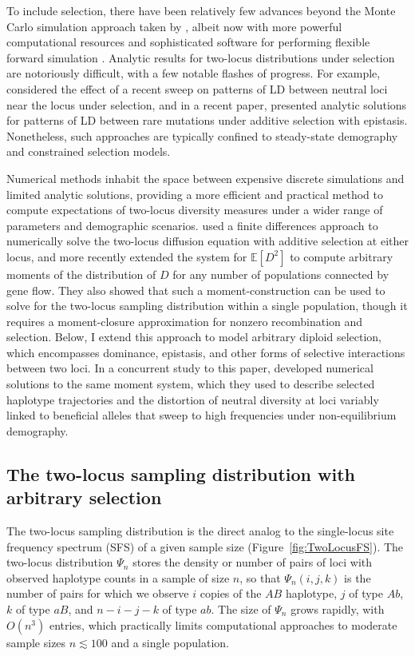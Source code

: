 \documentclass[]{article}
\newcommand{\E}{\mathbb{E}}
\begin{document}
To include selection, there have been relatively few advances beyond
the Monte Carlo simulation approach taken by \citet{Hill1966-gv}, albeit now
with more powerful computational resources and sophisticated software for
performing flexible forward simulation
\citep[e.g.,][]{Thornton2019-qc,Haller2019-vm}. Analytic results for two-locus
distributions under selection are notoriously difficult, with a few notable
flashes of progress. For example, \citet{McVean2007-xd} considered the effect
of a recent sweep on patterns of LD between neutral loci near the locus under
selection, and in a recent paper, \citet{Good2022-ot} presented analytic
solutions for patterns of LD between rare mutations under additive selection
with epistasis. Nonetheless, such approaches are typically confined to
steady-state demography and constrained selection models.

Numerical methods inhabit the space between expensive discrete simulations and
limited analytic solutions, providing a more efficient and practical method to
compute expectations of two-locus diversity measures under a wider range of
parameters and demographic scenarios. \citet{Ragsdale2017-gg} used a finite
differences approach to numerically solve the two-locus diffusion equation with
additive selection at either locus, and \citet{Ragsdale2019-nt} more recently
extended the \citet{Hill1968-vu} system for \(\E[D^2]\) to compute arbitrary
moments of the distribution of \(D\) for any number of populations connected by
gene flow. They also showed that such a moment-construction can be used to
solve for the two-locus sampling distribution within a single population,
though it requires a moment-closure approximation for nonzero recombination and
selection. Below, I extend this approach to model arbitrary diploid selection,
which encompasses dominance, epistasis, and other forms of selective
interactions between two loci. In a concurrent study to this paper,
\citet{Friedlander2022-bs} developed numerical solutions to the same moment
system, which they used to describe selected haplotype trajectories and the
distortion of neutral diversity at loci variably linked to beneficial alleles
that sweep to high frequencies under non-equilibrium demography.

\subsection{The two-locus sampling distribution with arbitrary selection}

The two-locus sampling distribution is the direct analog to the single-locus
site frequency spectrum (SFS) of a given sample size
(Figure~\ref{fig:TwoLocusFS}). The two-locus
distribution \(\Psi_n\) stores the density or number of pairs of loci with
observed haplotype counts in a sample of size \(n\),
so that \(\Psi_n(i, j, k)\) is the number of pairs
for which we observe \(i\) copies of the \(AB\) haplotype, \(j\) of type
\(Ab\), \(k\) of type \(aB\), and \(n-i-j-k\) of type \(ab\). The size of
\(\Psi_n\) grows rapidly, with \(O(n^3)\) entries, which practically limits
computational approaches to moderate sample sizes \(n\lesssim 100\) and a
single population.
\end{document}
